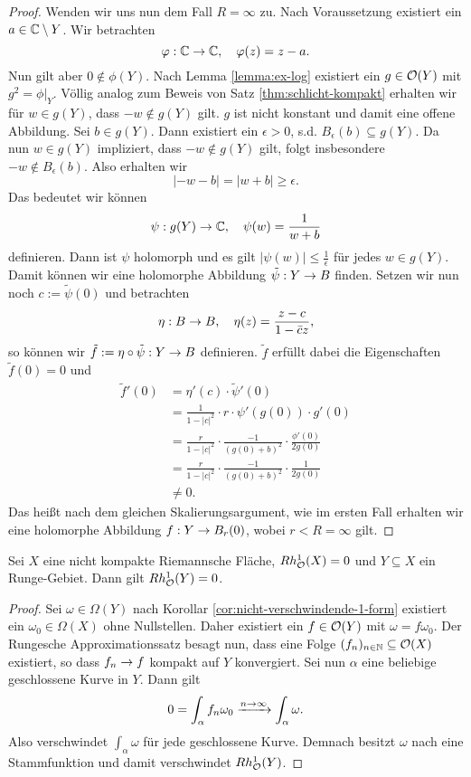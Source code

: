 \begin{proof}
  Wenden wir uns nun dem Fall $R = \infty$ zu. Nach Voraussetzung
  existiert ein $a \in \mathbb{C} \setminus Y$. Wir betrachten
  \[
  \varphi: \mathbb{C} \rightarrow \mathbb{C}, \quad \varphi(z) = z -a.
  \]
  Nun gilt aber $0 \notin \phi(Y)$. Nach Lemma \ref{lemma:ex-log}
  existiert ein $g \in \mathcal{O}(Y)$ mit $g^2 = \phi|_Y$. Völlig analog
  zum Beweis von Satz \ref{thm:schlicht-kompakt} erhalten wir für $w
  \in g(Y)$, dass $-w \notin g(Y)$ gilt. $g$ ist nicht konstant und damit
  eine offene Abbildung. Sei $b \in g(Y)$. Dann existiert ein
  $\epsilon > 0$, s.d. $B_{\epsilon}(b) \subseteq g(Y)$. Da nun  $w
  \in g(Y)$ impliziert, dass $-w \notin g(Y)$ gilt, folgt insbesondere $-w \notin
  B_\epsilon(b)$. Also erhalten wir
  \[
  |-w - b| = |w + b| \geq \epsilon.
  \]
  Das bedeutet wir können
  \[
  \psi: g(Y) \rightarrow \mathbb{C}, \quad \psi(w) = \frac{1}{w+b}
  \]
  definieren. Dann ist $\psi$ holomorph und es gilt $|\psi(w)| \leq
  \frac{1}{\epsilon}$ für jedes $w \in g(Y)$. 
  Damit können wir eine holomorphe Abbildung $\tilde \psi: Y \rightarrow B$
  finden. Setzen wir nun noch $c:= \tilde \psi(0)$ und betrachten
  \[
  \eta: B \rightarrow B, \quad \eta(z) = \frac{z-c}{1-\bar c z},
  \]
  so können wir $\tilde f := \eta \circ \tilde \psi: Y \rightarrow B$
  definieren. $\tilde f$ erfüllt dabei die Eigenschaften $\tilde f(0)
  = 0$ und
  \begin{align*}
    \tilde f'(0) & = \eta'(c) \cdot \tilde \psi'(0) \\
    & = \frac{1}{1- |c|^2} \cdot r \cdot \psi'(g(0)) \cdot g'(0) \\
    & = \frac{r}{1 - |c|^2} \cdot \frac{-1}{(g(0) + b)^2} \cdot
    \frac{\phi'(0)}{2 g(0)} \\
    & = \frac{r}{1- |c|^2} \cdot \frac{-1}{(g(0) + b)^2} \cdot
    \frac{1}{2 g(0)} \\
    & \neq 0.
  \end{align*}
  Das heißt nach dem gleichen Skalierungsargument, wie im ersten
  Fall erhalten wir eine holomorphe Abbildung $f: Y \rightarrow B_r(0)$, wobei
  $r < R = \infty$ gilt.
\end{proof}

\begin{lemma}
  \label{lemma:runge-keine-kohomo}
  Sei $X$ eine nicht kompakte Riemannsche Fläche, $Rh_{\mathcal{O}}^1(X) = 0$ und
  $Y \subseteq X$ ein Runge-Gebiet. Dann gilt $Rh_{\mathcal{O}}^1(Y) = 0$.
\end{lemma}

\begin{proof}
  Sei $\omega \in \Omega(Y)$ nach Korollar
  \ref{cor:nicht-verschwindende-1-form} existiert ein $\omega_0 \in
  \Omega(X)$ ohne Nullstellen. Daher
  existiert ein $f \in \mathcal{O}(Y)$ mit $\omega = f \omega_0$. 
  Der Rungesche Approximationssatz besagt nun, dass eine Folge $(f_n)_{n
    \in \mathbb{N}} \subseteq \mathcal{O}(X)$ existiert, so dass $f_n \rightarrow f$ kompakt
  auf $Y$ konvergiert.
  Sei nun $\alpha$ eine beliebige geschlossene Kurve in $Y$. 
  Dann gilt
  \[
  0 = \int_\alpha f_n \omega_0 \xrightarrow{n \rightarrow \infty} \int_\alpha
  \omega.
  \]
  Also verschwindet $\int_\alpha \omega$ für jede geschlossene
  Kurve. Demnach besitzt $\omega$ nach \cite[Satz 10.15]{For} eine Stammfunktion und
  damit verschwindet $Rh_{\mathcal{O}}^1(Y)$.
\end{proof}


